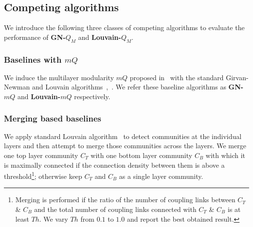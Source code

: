 

\subsection{Competing algorithms}
We introduce the following three classes of competing algorithms to evaluate the
performance of \textbf{GN-$Q_M$} and \textbf{Louvain-$Q_M$}.

\subsubsection{Baselines with $mQ$} We induce the multilayer modularity $mQ$ proposed in~\cite{medical_paper} with the standard
 Girvan-Newman and Louvain algorithms~\cite{newman2004finding},~\cite{blondel2008fast}. We refer these baseline algorithms 
 as \textbf{GN-$mQ$} and \textbf{Louvain-$mQ$} respectively.

\subsubsection{Merging based baselines} We apply standard Louvain algorithm~\cite{blondel2008fast} to
 detect communities at the individual layers and then attempt to merge those communities across the layers.
 We merge one top layer community $C_T$ with one bottom layer community $C_B$ with which it is maximally connected 
 if the connection density between them is above a threshold\footnote{Merging is performed if the ratio of the number of coupling links 
 between $C_T$ \& $C_B$ and the total number of 
 coupling links connected with $C_T$ \& $C_B$ is at least $Th$. We vary $Th$ from $0.1$ to $1.0$ and report the best obtained result.}; 
 otherwise keep $C_T$ and $C_B$ as a single layer community.


